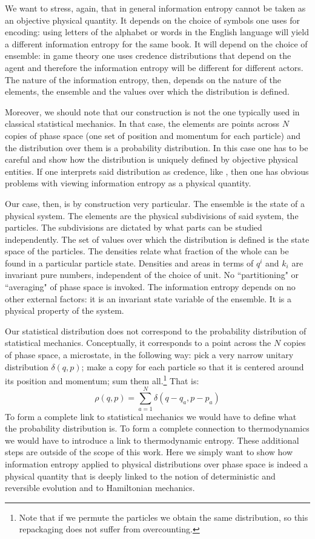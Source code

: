 \documentclass[11pt]{elsarticle}
\begin{document}
We want to stress, again, that in general information entropy cannot be taken as an objective physical quantity. It depends on the choice of symbols one uses for encoding: using letters of the alphabet or words in the English language will yield a different information entropy for the same book. It will depend on the choice of ensemble: in game theory one uses credence distributions that depend on the agent and therefore the information entropy will be different for different actors. The nature of the information entropy, then, depends on the nature of the elements, the ensemble and the values over which the distribution is defined.

Moreover, we should note that our construction is not the one typically used in classical statistical mechanics. In that case, the elements are points across $N$ copies of phase space (one set of position and momentum for each particle) and the distribution over them is a probability distribution. In this case one has to be careful and show how the distribution is uniquely defined by objective physical entities. If one interprets said distribution as credence, like \cite{Jaynes}, then one has obvious problems with viewing information entropy as a physical quantity.

Our case, then, is by construction very particular. The ensemble is the state of a physical system. The elements are the physical subdivisions of said system, the particles. The subdivisions are dictated by what parts can be studied independently. The set of values over which the distribution is defined is the state space of the particles. The densities relate what fraction of the whole can be found in a particular particle state. Densities and areas in terms of $q^i$ and $k_i$ are invariant pure numbers, independent of the choice of unit. No ``partitioning" or ``averaging" of phase space is invoked. The information entropy depends on no other external factors: it is an invariant state variable of the ensemble. It is a physical property of the system.

Our statistical distribution does not correspond to the probability distribution of statistical mechanics. Conceptually, it corresponds to a point across the $N$ copies of phase space, a microstate, in the following way: pick a very narrow unitary distribution $\delta(q,p)$; make a copy for each particle so that it is centered around its position and momentum; sum them all.\footnote{Note that if we permute the particles we obtain the same distribution, so this repackaging does not suffer from overcounting.} That is:
\begin{equation}
\rho(q,p) = \sum\limits_{a=1}^N \delta(q - q_a, p - p_a)
\end{equation}
To form a complete link to statistical mechanics we would have to define what the probability distribution is. To form a complete connection to thermodynamics we would have to introduce a link to thermodynamic entropy. These additional steps are outside of the scope of this work. Here we simply want to show how information entropy applied to physical distributions over phase space is indeed a physical quantity that is deeply linked to the notion of deterministic and reversible evolution and to Hamiltonian mechanics.
\end{document}
